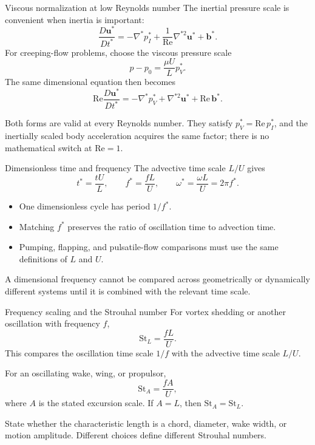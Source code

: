 \documentclass[aspectratio=169,11pt]{beamer}
\newcommand{\uvec}{\bm{u}}
\newcommand{\bvec}{\bm{b}}
\begin{document}
\begin{frame}{Viscous normalization at low Reynolds number}
The inertial pressure scale is convenient when inertia is important:
\[
  \frac{D\uvec^*}{Dt^*}
  =-\nabla^*p_I^*+\frac{1}{\mathrm{Re}}\nabla^{*2}\uvec^*+\bvec^*.
\]
For creeping-flow problems, choose the viscous pressure scale
\[
  p-p_0=\frac{\mu U}{L}p_V^*.
\]
The same dimensional equation then becomes
\[
  \boxed{
  \mathrm{Re}\frac{D\uvec^*}{Dt^*}
  =-\nabla^*p_V^*+\nabla^{*2}\uvec^*+\mathrm{Re}\,\bvec^*
  }.
\]
\begin{punchbox}
\small Both forms are valid at every Reynolds number. They satisfy $p_V^*=\mathrm{Re}\,p_I^*$, and the inertially scaled body acceleration acquires the same factor; there is no mathematical switch at $\mathrm{Re}=1$.
\end{punchbox}
\end{frame}

\begin{frame}{Dimensionless time and frequency}
The advective time scale $L/U$ gives
\[
  t^*=\frac{tU}{L},
  \qquad
  f^*=\frac{fL}{U},
  \qquad
  \omega^*=\frac{\omega L}{U}=2\pi f^*.
\]
\begin{itemize}\itemsep6pt
  \item One dimensionless cycle has period $1/f^*$.
  \item Matching $f^*$ preserves the ratio of oscillation time to advection time.
  \item Pumping, flapping, and pulsatile-flow comparisons must use the same definitions of $L$ and $U$.
\end{itemize}
\begin{punchbox}
\small A dimensional frequency cannot be compared across geometrically or dynamically different systems until it is combined with the relevant time scale.
\end{punchbox}
\end{frame}

\begin{frame}{Frequency scaling and the Strouhal number}
For vortex shedding or another oscillation with frequency $f$,
\[
  \boxed{\mathrm{St}_L=\frac{fL}{U}}.
\]
This compares the oscillation time scale $1/f$ with the advective time scale $L/U$.

For an oscillating wake, wing, or propulsor,
\[
  \boxed{\mathrm{St}_A=\frac{fA}{U}},
\]
where $A$ is the stated excursion scale. If $A=L$, then $\mathrm{St}_A=\mathrm{St}_L$.

\begin{punchbox}
\small State whether the characteristic length is a chord, diameter, wake width, or motion amplitude. Different choices define different Strouhal numbers.
\end{punchbox}
\end{frame}
\end{document}
